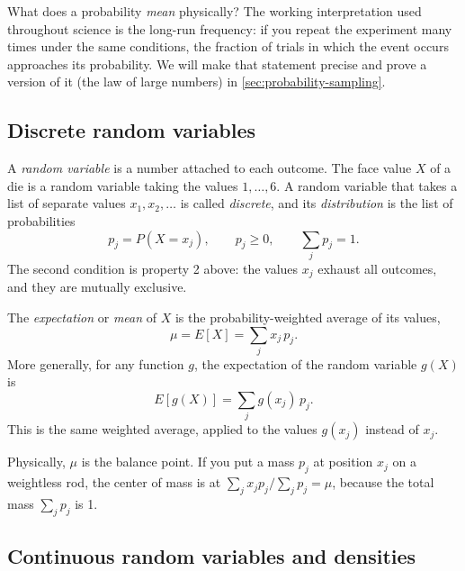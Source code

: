 What does a probability \emph{mean} physically? The working interpretation used throughout science is the long-run frequency: if you repeat the experiment many times under the same conditions, the fraction of trials in which the event occurs approaches its probability. We will make that statement precise and prove a version of it (the law of large numbers) in \cref{sec:probability-sampling}.

\subsection{Discrete random variables}

A \emph{random variable} is a number attached to each outcome. The face value $X$ of a die is a random variable taking the values $1,\dots,6$. A random variable that takes a list of separate values $x_1,x_2,\dots$ is called \emph{discrete}, and its \emph{distribution} is the list of probabilities
\begin{equation}
p_j = P(X=x_j),\qquad p_j\ge 0,\qquad \sum_j p_j = 1 .
\label{eq:probability-discrete}
\end{equation}
The second condition is property 2 above: the values $x_j$ exhaust all outcomes, and they are mutually exclusive.

The \emph{expectation} or \emph{mean} of $X$ is the probability-weighted average of its values,
\begin{equation}
\mu = E[X] = \sum_j x_j\,p_j .
\label{eq:probability-mean-discrete}
\end{equation}
More generally, for any function $g$, the expectation of the random variable $g(X)$ is
\begin{equation}
E[g(X)] = \sum_j g(x_j)\,p_j .
\label{eq:probability-Eg-discrete}
\end{equation}
This is the same weighted average, applied to the values $g(x_j)$ instead of $x_j$.

Physically, $\mu$ is the balance point. If you put a mass $p_j$ at position $x_j$ on a weightless rod, the center of mass is at $\sum_j x_j p_j/\sum_j p_j=\mu$, because the total mass $\sum_j p_j$ is 1.

\subsection{Continuous random variables and densities}

